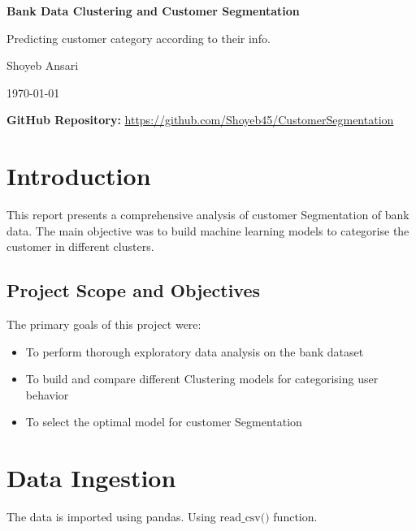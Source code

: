 \documentclass[12pt]{article}
\begin{document}
\begin{titlepage}
    \centering
    \vspace*{2cm}
    {\LARGE\bfseries Bank Data Clustering and Customer Segmentation\par}
    \vspace{2cm}
    {\Large Predicting customer category according to their info.\par}
    \vspace{3cm}
    {\Large Shoyeb Ansari\par}
    \vspace{1cm}
    {\large\today\par}
    \vfill
    {\large\textbf{GitHub Repository:} \url{https://github.com/Shoyeb45/CustomerSegmentation}\par}
\end{titlepage}

\thispagestyle{empty}
\tableofcontents
\pagebreak

\listoffigures
\pagebreak

\listoftables
\pagebreak


\section{Introduction}
This report presents a comprehensive analysis of customer Segmentation of bank data. The main objective was to build machine learning models to categorise the customer in different clusters. 

\subsection{Project Scope and Objectives}
The primary goals of this project were:
\begin{itemize}
    \item To perform thorough exploratory data analysis on the bank dataset
    \item To build and compare different Clustering models for categorising user behavior
    \item To select the optimal model for customer Segmentation
\end{itemize}


\section{Data Ingestion}

The data is imported using pandas. Using $\text{read\_csv()}$ function.
\end{document}
